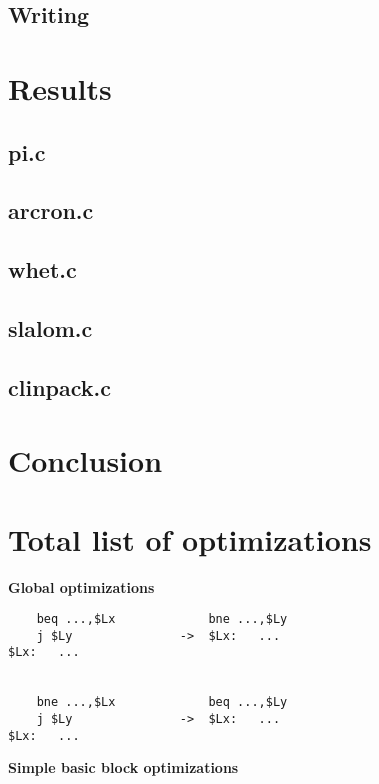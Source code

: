 \documentclass[10pt,a4paper]{article}
\begin{document}
\subsection{Writing}



\section{Results}

\subsection{pi.c}

\subsection{arcron.c}

\subsection{whet.c}

\subsection{slalom.c}

\subsection{clinpack.c}

\section{Conclusion}

\appendix

\section{Total list of optimizations}

\label{opt}

\textbf{Global optimizations}

\begin{verbatim}
    beq ...,$Lx             bne ...,$Ly
    j $Ly               ->  $Lx:   ...
$Lx:   ...


    bne ...,$Lx             beq ...,$Ly
    j $Ly               ->  $Lx:   ...
$Lx:   ...
\end{verbatim}
\textbf{Simple basic block optimizations}
\end{document}
